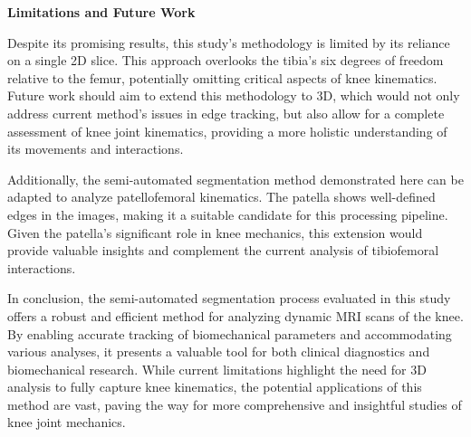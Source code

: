 \documentclass{micro-econ-thesis}
\begin{document}
\textbf{Limitations and Future Work}

Despite its promising results, this study's methodology is limited by its reliance on a single 2D slice. This approach overlooks the tibia's six degrees of freedom relative to the femur, potentially omitting critical aspects of knee kinematics. Future work should aim to extend this methodology to 3D, which would not only address current method's issues in edge tracking, but also allow for a complete assessment of knee joint kinematics, providing a more holistic understanding of its movements and interactions.

Additionally, the semi-automated segmentation method demonstrated here can be adapted to analyze patellofemoral kinematics. The patella shows well-defined edges in the images, making it a suitable candidate for this processing pipeline. Given the patella's significant role in knee mechanics, this extension would provide valuable insights and complement the current analysis of tibiofemoral interactions.

In conclusion, the semi-automated segmentation process evaluated in this study offers a robust and efficient method for analyzing dynamic MRI scans of the knee. By enabling accurate tracking of biomechanical parameters and accommodating various analyses, it presents a valuable tool for both clinical diagnostics and biomechanical research. While current limitations highlight the need for 3D analysis to fully capture knee kinematics, the potential applications of this method are vast, paving the way for more comprehensive and insightful studies of knee joint mechanics.
\cleardoublepage
{}
{} %
\printbibliography
\end{document}
